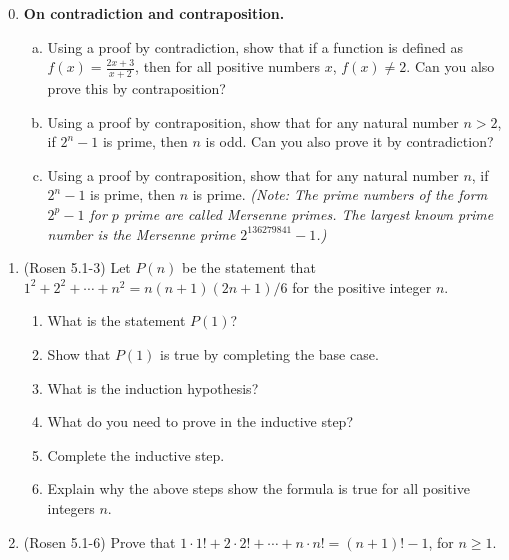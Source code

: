 \begin{enumerate}
\setcounter{enumi}{-1}
\item \textbf{On contradiction and contraposition.}
\begin{enumerate}[(a)]
    \item \streasy Using a proof by contradiction, show that if a function is defined as $f(x) = \frac{2x+3}{x+2}$, then for all positive numbers $x$, $f(x) \neq 2$. Can you also prove this by contraposition?
    \item \streasy Using a proof by contraposition, show that for any natural number $n > 2$, if $2^n - 1$ is prime, then $n$ is odd. Can you also prove it by contradiction?
    \item \strhard Using a proof by contraposition, show that for any natural number $n$, if $2^n-1$ is prime, then $n$ is prime. \textit{(Note: The prime numbers of the form $2^p-1$ for $p$ prime are called Mersenne primes. The largest known prime number is the Mersenne prime $2^{136279841}-1$.)}
\end{enumerate}
\item (Rosen 5.1-3) Let $P(n)$ be the statement that
$1^{2} + 2^{2} + \cdots + n^{2} = n(n+1)(2n+1)/6$ for the positive integer $n$.

\begin{enumerate}
\item \streasy What is the statement $P(1)$?

\item \streasy Show that $P(1)$ is true by completing the base case.

\item \streasy What is the induction hypothesis?

\item \streasy What do you need to prove in the inductive step?

\item \strmedium Complete the inductive step.

\item \streasy Explain why the above steps show the formula is true for all positive integers $n$.
\end{enumerate}

\item \strmedium (Rosen 5.1-6) Prove that $1 \cdot 1! + 2 \cdot 2! + \cdots + n \cdot n! = (n+1)! -1$, 
for $n \geq 1$.


\end{enumerate}

